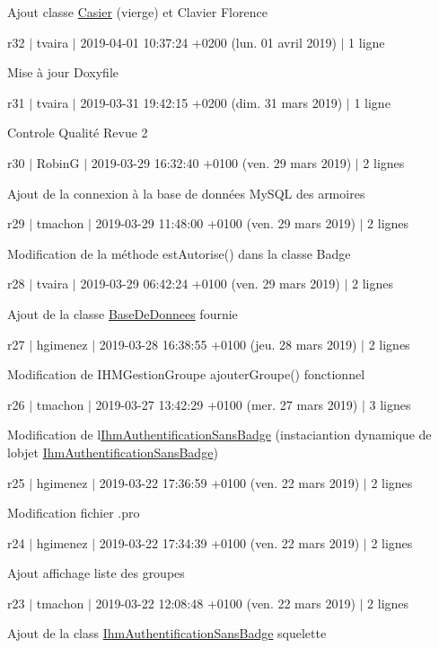 Ajout classe \hyperlink{class_casier}{Casier} (vierge) et Clavier Florence

r32 $\vert$ tvaira $\vert$ 2019-\/04-\/01 10\+:37\+:24 +0200 (lun. 01 avril 2019) $\vert$ 1 ligne

Mise à jour Doxyfile

r31 $\vert$ tvaira $\vert$ 2019-\/03-\/31 19\+:42\+:15 +0200 (dim. 31 mars 2019) $\vert$ 1 ligne

Controle Qualité Revue 2

r30 $\vert$ RobinG $\vert$ 2019-\/03-\/29 16\+:32\+:40 +0100 (ven. 29 mars 2019) $\vert$ 2 lignes

Ajout de la connexion à la base de données My\+S\+QL des armoires

r29 $\vert$ tmachon $\vert$ 2019-\/03-\/29 11\+:48\+:00 +0100 (ven. 29 mars 2019) $\vert$ 2 lignes

Modification de la méthode est\+Autorise() dans la classe Badge

r28 $\vert$ tvaira $\vert$ 2019-\/03-\/29 06\+:42\+:24 +0100 (ven. 29 mars 2019) $\vert$ 2 lignes

Ajout de la classe \hyperlink{class_base_de_donnees}{Base\+De\+Donnees} fournie

r27 $\vert$ hgimenez $\vert$ 2019-\/03-\/28 16\+:38\+:55 +0100 (jeu. 28 mars 2019) $\vert$ 2 lignes

Modification de I\+H\+M\+Gestion\+Groupe ajouter\+Groupe() fonctionnel

r26 $\vert$ tmachon $\vert$ 2019-\/03-\/27 13\+:42\+:29 +0100 (mer. 27 mars 2019) $\vert$ 3 lignes

Modification de l\textquotesingle{}\hyperlink{class_ihm_authentification_sans_badge}{Ihm\+Authentification\+Sans\+Badge} (instaciantion dynamique de l\textquotesingle{}objet \hyperlink{class_ihm_authentification_sans_badge}{Ihm\+Authentification\+Sans\+Badge})

r25 $\vert$ hgimenez $\vert$ 2019-\/03-\/22 17\+:36\+:59 +0100 (ven. 22 mars 2019) $\vert$ 2 lignes

Modification fichier .pro

r24 $\vert$ hgimenez $\vert$ 2019-\/03-\/22 17\+:34\+:39 +0100 (ven. 22 mars 2019) $\vert$ 2 lignes

Ajout affichage liste des groupes

r23 $\vert$ tmachon $\vert$ 2019-\/03-\/22 12\+:08\+:48 +0100 (ven. 22 mars 2019) $\vert$ 2 lignes

Ajout de la class \hyperlink{class_ihm_authentification_sans_badge}{Ihm\+Authentification\+Sans\+Badge} squelette

